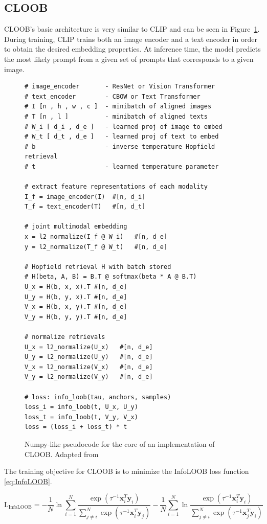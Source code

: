 \documentclass{scrarticle}
\begin{document}
\subsection{CLOOB}

CLOOB's basic architecture is very similar to CLIP and can be seen in Figure~\ref{fig:pseudo_cloob}. During training, CLIP trains both an image encoder and a text encoder in order to obtain the desired embedding properties. At inference time, the model predicts the most likely prompt from a given set of prompts that corresponds to a given image.

\begin{figure}[H]  %
  \begin{lstlisting}[style=Py2]
# image_encoder       - ResNet or Vision Transformer
# text_encoder        - CBOW or Text Transformer
# I [n , h , w , c ]  - minibatch of aligned images
# T [n , l ]          - minibatch of aligned texts
# W_i [ d_i , d_e ]   - learned proj of image to embed
# W_t [ d_t , d_e ]   - learned proj of text to embed
# b                   - inverse temperature Hopfield retrieval
# t                   - learned temperature parameter

# extract feature representations of each modality
I_f = image_encoder(I)  #[n, d_i]
T_f = text_encoder(T)   #[n, d_t]

# joint multimodal embedding
x = l2_normalize(I_f @ W_i)   #[n, d_e]
y = l2_normalize(T_f @ W_t)   #[n, d_e]

# Hopfield retrieval H with batch stored
# H(beta, A, B) = B.T @ softmax(beta * A @ B.T)
U_x = H(b, x, x).T #[n, d_e]
U_y = H(b, y, x).T #[n, d_e]
V_x = H(b, x, y).T #[n, d_e]
V_y = H(b, y, y).T #[n, d_e]

# normalize retrievals
U_x = l2_normalize(U_x)   #[n, d_e] 
U_y = l2_normalize(U_y)   #[n, d_e] 
V_x = l2_normalize(V_x)   #[n, d_e] 
V_y = l2_normalize(V_y)   #[n, d_e]

# loss: info_loob(tau, anchors, samples) 
loss_i = info_loob(t, U_x, U_y)
loss_t = info_loob(t, V_y, V_x)
loss = (loss_i + loss_t) * t
  \end{lstlisting}
  \caption{Numpy-like pseudocode for the core of an implementation of CLOOB. Adapted from \citet{cloob}}
  \label{fig:pseudo_cloob}
\end{figure}

The training objective for CLOOB is to minimize the InfoLOOB loss function \eqref{eq:InfoLOOB}.

\begin{equation}\label{eq:InfoLOOB}
  \operatorname{L_{InfoLOOB}} =
  -\frac{1}{N} \ln \sum_{i=1}^{N} \frac{\exp(\tau^{-1}\mathbf{x}_i^T \mathbf{y}_i)}{\sum_{j \neq i}^{N} \exp(\tau^{-1} \mathbf{x}_i^T \mathbf{y}_j)}
  - \frac{1}{N} \sum_{i=1}^{N} \ln \frac{\exp(\tau^{-1}\mathbf{x}_i^T \mathbf{y}_i)}{\sum_{j\neq i}^{N}\exp(\tau^{-1} \mathbf{x}_j^T \mathbf{y}_i)}
\end{equation}
\end{document}
